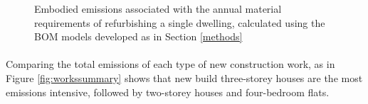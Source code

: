 \documentclass[12pt]{article}
\begin{document}
\begin{figure}[!ht]
    \centering
        \caption{Embodied emissions associated with the annual material requirements of refurbishing a single dwelling, calculated using the BOM models developed as in Section \ref{methods}}
        \label{fig:individualworksref}
\end{figure}

\paragraph{}
Comparing the total emissions of each type of new construction work, as in Figure \ref{fig:workssummary} shows that new build three-storey houses are the most emissions intensive, followed by two-storey houses and four-bedroom flats.
\end{document}
